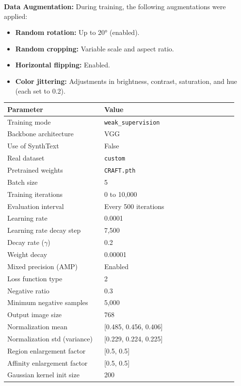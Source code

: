 \noindent
\textbf{Data Augmentation:} During training, the following augmentations were applied:
\begin{itemize}
    \item \textbf{Random rotation:} Up to 20° (enabled).
    \item \textbf{Random cropping:} Variable scale and aspect ratio.
    \item \textbf{Horizontal flipping:} Enabled.
    \item \textbf{Color jittering:} Adjustments in brightness, contrast, saturation, and hue (each set to 0.2).
\end{itemize}



\begin{table}[ht]
\centering
\begin{tabular}{|p{0.4\linewidth}|p{0.55\linewidth}|}
\hline
\textbf{Parameter} & \textbf{Value} \\
\hline
Training mode & \texttt{weak\_supervision} \\
Backbone architecture & VGG \\
Use of SynthText & False \\ 
Real dataset & \texttt{custom} \\
Pretrained weights & \texttt{CRAFT.pth} \\
Batch size & 5 \\
Training iterations & 0 to 10,000 \\
Evaluation interval & Every 500 iterations \\
Learning rate & 0.0001 \\
Learning rate decay step & 7,500 \\
Decay rate ($\gamma$) & 0.2 \\
Weight decay & 0.00001 \\
Mixed precision (AMP) & Enabled \\
Loss function type & 2 \\
Negative ratio & 0.3 \\
Minimum negative samples & 5,000 \\
Output image size & 768 \\
Normalization mean & [0.485, 0.456, 0.406] \\
Normalization std (variance) & [0.229, 0.224, 0.225] \\
Region enlargement factor & [0.5, 0.5] \\
Affinity enlargement factor & [0.5, 0.5] \\
Gaussian kernel init size & 200 \\

\end{tabular}
\end{table}
